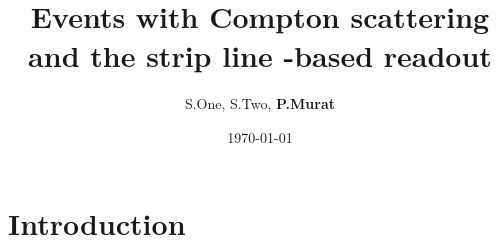\documentclass{beamer}[10pt]
\title{
  \underline \small {\bf Events with Compton scattering and the strip line -based readout }
}
\author{
  \fontseries{s}
  \fontsize{6}{8}
  \selectfont
  S.One, S.Two, {\bf P.Murat}
}
\date{\today}
\begin{document}
\begin{frame}
  \titlepage
\end{frame}

% 
% 



\section{Introduction}
\end{document}
